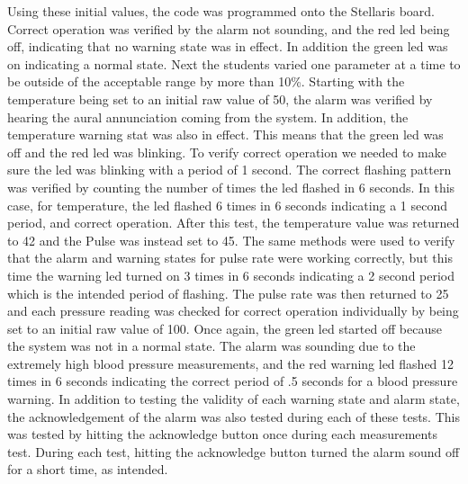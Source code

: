\documentclass[12pt]{article} %
\begin{document}
Using these initial values, the code was programmed onto the Stellaris board.
Correct operation was verified by the alarm not sounding, and the red led being
off, indicating that no warning state was in effect. In addition the green led
was on indicating a normal state. Next the students varied one parameter at a
time to be outside of the acceptable range by more than 10\%. Starting with the
temperature being set to an initial raw value of 50, the alarm was verified by
hearing the aural annunciation coming from the system. In addition, the
temperature warning stat was also in effect. This means that the green led was
off and the red led was blinking. To verify correct operation we needed to make
sure the led was blinking with a period of 1 second. The correct flashing
pattern was verified by counting the number of times the led flashed in 6
seconds. In this case, for temperature, the led flashed 6 times in 6 seconds
indicating a 1 second period, and correct operation. After this test, the
temperature value was returned to 42 and the Pulse was instead set to 45. The
same methods were used to verify that the alarm and warning states for pulse
rate were working correctly, but this time the warning led turned on 3 times in
6 seconds indicating a 2 second period which is the intended period of
flashing. The pulse rate was then returned to 25 and each pressure reading was
checked for correct operation individually by being set to an initial raw value
of 100. Once again, the green led started off because the system was not in a
normal state. The alarm was sounding due to the extremely high blood pressure
measurements, and the red warning led flashed 12 times in 6 seconds indicating
the correct period of .5 seconds for a blood pressure warning. In addition to
testing the validity of each warning state and alarm state, the acknowledgement
of the alarm was also tested during each of these tests. This was tested by
hitting the acknowledge button once during each measurements test. During each
test, hitting the acknowledge button turned the alarm sound off for a short
time, as intended. 
\end{document}
